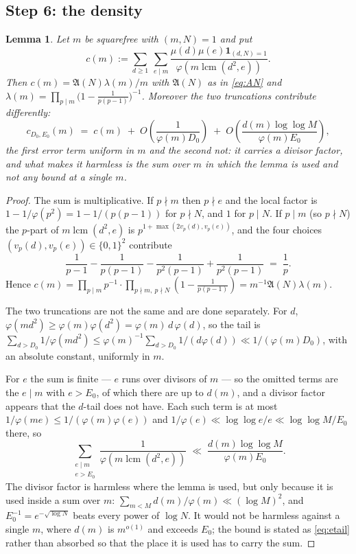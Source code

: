 \documentclass[11pt,a4paper]{article}
\theoremstyle{plain}
\newtheorem{lemma}[theorem]{Lemma}
\theoremstyle{definition}
\theoremstyle{remark}
\newcommand{\AAA}{\mathfrak{A}}
\DeclareMathOperator{\lcm}{lcm}
\begin{document}
\subsection{Step 6: the density}

\begin{lemma}\label{lem:density}
Let $m$ be squarefree with $(m,N)=1$ and put
\[
  c(m):=\sum_{d\ge1}\ \sum_{e\mid m}
     \frac{\mu(d)\mu(e)\mathbf 1_{(d,N)=1}}{\varphi(m\lcm(d^2,e))}.
\]
Then $c(m)=\AAA(N)\lambda(m)/m$ with $\AAA(N)$ as in \eqref{eq:AN} and
$\lambda(m)=\prod_{p\mid m}\bigl(1-\tfrac{1}{p(p-1)}\bigr)^{-1}$.
Moreover the two truncations contribute differently:
\begin{equation}\label{eq:ctrunc}
  c_{D_0,E_0}(m)\;=\;c(m)\;+\;O\!\left(\frac{1}{\varphi(m)D_0}\right)
  \;+\;O\!\left(\frac{d(m)\log\log M}{\varphi(m)E_0}\right),
\end{equation}
the first error term uniform in $m$ and the second not: it carries a
divisor factor, and what makes it harmless is the sum over $m$ in which
the lemma is used and not any bound at a single $m$.
\end{lemma}

\begin{proof}
The sum is multiplicative. If $p\nmid m$ then $p\nmid e$ and the local
factor is $1-1/\varphi(p^2)=1-1/(p(p-1))$ for $p\nmid N$, and $1$ for
$p\mid N$. If $p\mid m$ (so $p\nmid N$) the $p$-part of
$m\lcm(d^2,e)$ is $p^{1+\max(2v_p(d),v_p(e))}$, and the four choices
$(v_p(d),v_p(e))\in\{0,1\}^2$ contribute
\[
  \frac{1}{p-1}-\frac{1}{p(p-1)}-\frac{1}{p^2(p-1)}+\frac{1}{p^2(p-1)}
  \;=\;\frac{1}{p}.
\]
Hence $c(m)=\prod_{p\mid m}p^{-1}\cdot
\prod_{p\nmid m,\ p\nmid N}(1-\tfrac{1}{p(p-1)})
=m^{-1}\AAA(N)\lambda(m)$.

The two truncations are not the same and are done separately. For $d$,
$\varphi(md^2)\ge\varphi(m)\varphi(d^2)=\varphi(m)\,d\,\varphi(d)$, so
the tail is
$\sum_{d>D_0}1/\varphi(md^2)\le\varphi(m)^{-1}\sum_{d>D_0}1/(d\varphi(d))
\ll1/(\varphi(m)D_0)$, with an absolute constant, uniformly in $m$.

For $e$ the sum is finite --- $e$ runs over divisors of $m$ --- so the
omitted terms are the $e\mid m$ with $e>E_0$, of which there are up to
$d(m)$, and a divisor factor appears that the $d$-tail does not have.
Each such term is at most $1/\varphi(me)\le1/(\varphi(m)\varphi(e))$
and $1/\varphi(e)\ll\log\log e/e\ll\log\log M/E_0$ there, so
\begin{equation}\label{eq:etail}
  \sum_{\substack{e\mid m\\ e>E_0}}\frac{1}{\varphi(m\lcm(d^2,e))}
  \;\ll\;\frac{d(m)\log\log M}{\varphi(m)E_0}.
\end{equation}
The divisor factor is harmless where the lemma is used, but only
because it is used inside a sum over $m$: $\sum_{m<M}d(m)/\varphi(m)
\ll(\log M)^{2}$, and $E_0^{-1}=e^{-\sqrt{\log N}}$ beats every power
of $\log N$. It would not be harmless against a single $m$, where
$d(m)$ is $m^{o(1)}$ and exceeds $E_0$; the bound is stated as
\eqref{eq:etail} rather than absorbed so that the place it is used has
to carry the sum.
\end{proof}
\end{document}
